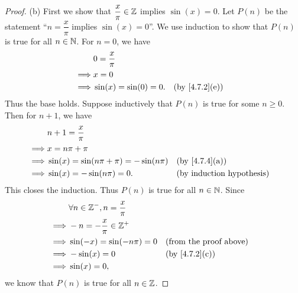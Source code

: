 \begin{proof}{(b)}
  First we show that \(\dfrac{x}{\pi} \in \mathbb{Z}\) implies \(\sin(x) = 0\).
  Let \(P(n)\) be the statement ``\(n = \dfrac{x}{\pi}\) implies \(\sin(x) = 0\)''.
  We use induction to show that \(P(n)\) is true for all \(n \in \mathbb{N}\).
  For \(n = 0\), we have
  \begin{align*}
             & 0 = \dfrac{x}{\pi}                                      \\
    \implies & x = 0                                                   \\
    \implies & \sin(x) = \sin(0) = 0. &  & \text{(by \cref{4.7.2}(e))}
  \end{align*}
  Thus the base holds.
  Suppose inductively that \(P(n)\) is true for some \(n \geq 0\).
  Then for \(n + 1\), we have
  \begin{align*}
             & n + 1 = \dfrac{x}{\pi}                                                      \\
    \implies & x = n \pi + \pi                                                             \\
    \implies & \sin(x) = \sin(n \pi + \pi) = -\sin(n \pi) &  & \text{(by \cref{4.7.4}(a))} \\
    \implies & \sin(x) = -\sin(n \pi) = 0.                &  & \byIH
  \end{align*}
  This closes the induction.
  Thus \(P(n)\) is true for all \(n \in \mathbb{N}\).
  Since
  \begin{align*}
             & \forall n \in \Z^-, n = \dfrac{x}{\pi}                                    \\
    \implies & -n = -\dfrac{x}{\pi} \in \Z^+                                             \\
    \implies & \sin(-x) = \sin(- n \pi) = 0           &  & \text{(from the proof above)} \\
    \implies & -\sin(x) = 0                           &  & \text{(by \cref{4.7.2}(c))}   \\
    \implies & \sin(x) = 0,
  \end{align*}
  we know that \(P(n)\) is true for all \(n \in \mathbb{Z}\).


\end{proof}
